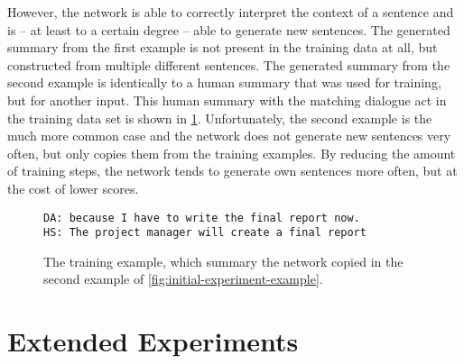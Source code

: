 However, the network is able to correctly interpret the context of a sentence and is -- at least to a certain degree -- able to generate new sentences.
The generated summary from the first example is not present in the training data at all, but constructed from multiple different sentences.
The generated summary from the second example is identically to a human summary that was used for training, but for another input.
This human summary with the matching dialogue act in the training data set is shown in \cref{fig:initial-experiment-training-example}.
Unfortunately, the second example is the much more common case and the network does not generate new sentences very often, but only copies them from the training examples.
By reducing the amount of training steps, the network tends to generate own sentences more often, but at the cost of lower scores.

\begin{figure}[h]
\begin{lstlisting}[numbers=none]
DA: because I have to write the final report now.
HS: The project manager will create a final report
\end{lstlisting}
\caption{The training example, which summary the network copied in the second example of \cref{fig:initial-experiment-example}.}
\label{fig:initial-experiment-training-example}
\end{figure}


\section{Extended Experiments}


